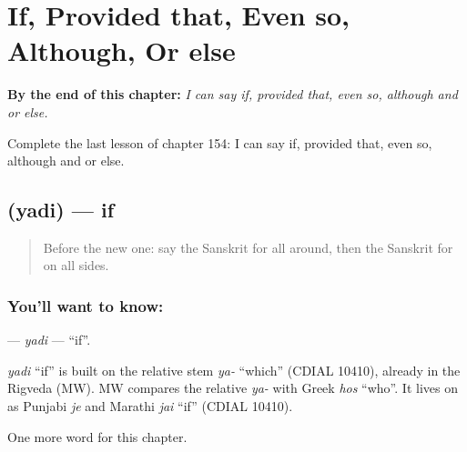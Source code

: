 
\chapter{If, Provided that, Even so, Although, Or else}
\label{ch:sa-if-provided-that-even-so-although-or-else}

\begin{chapteropening}
\textbf{By the end of this chapter:} \emph{I can say if, provided that, even so, although and or else.}

Complete the last lesson of chapter 154: I can say if, provided that, even so, although and or else.
\end{chapteropening}

\section[\texorpdfstring{\sk{यदि} (yadi)}{यदि (yadi)}]{ (yadi) — if}

\label{lesson:SA-C154-yadi}



\begin{quote}
Before the new one: say the Sanskrit for all around, then the Sanskrit for on all sides.
\end{quote}

\subsection*{You'll want to know: }
\textbf{} — \emph{yadi} — \textquotedblleft{}if\textquotedblright{}.

\begin{cousinweb}
\emph{yadi} \textquotedblleft{}if\textquotedblright{} is built on the relative stem \emph{ya-} \textquotedblleft{}which\textquotedblright{} (CDIAL 10410), already in the Rigveda (MW). MW compares the relative \emph{ya-} with Greek \emph{hos} \textquotedblleft{}who\textquotedblright{}. It lives on as Punjabi \emph{je} and Marathi \emph{jai} \textquotedblleft{}if\textquotedblright{} (CDIAL 10410).
\end{cousinweb}

\begin{grammarlens}[title={What you've built}]
One more word for this chapter.
\end{grammarlens}

